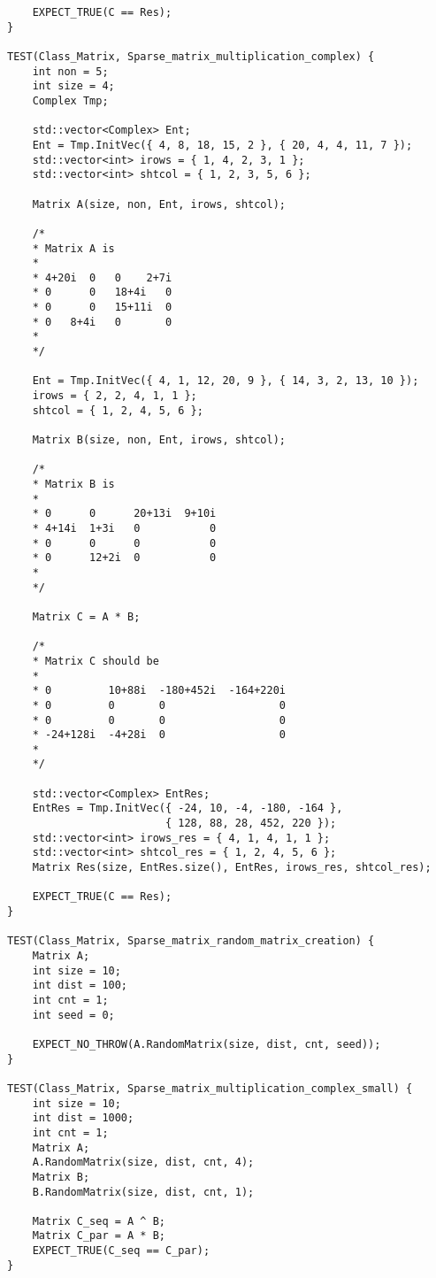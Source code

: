 \documentclass[12pt]{report}
\begin{document}
\begin{lstlisting}
    EXPECT_TRUE(C == Res);
}

TEST(Class_Matrix, Sparse_matrix_multiplication_complex) {
    int non = 5;
    int size = 4;
    Complex Tmp;

    std::vector<Complex> Ent;
    Ent = Tmp.InitVec({ 4, 8, 18, 15, 2 }, { 20, 4, 4, 11, 7 });
    std::vector<int> irows = { 1, 4, 2, 3, 1 };
    std::vector<int> shtcol = { 1, 2, 3, 5, 6 };

    Matrix A(size, non, Ent, irows, shtcol);

    /*
    * Matrix A is
    *
    * 4+20i  0   0    2+7i
    * 0      0   18+4i   0
    * 0      0   15+11i  0
    * 0   8+4i   0       0
    *
    */

    Ent = Tmp.InitVec({ 4, 1, 12, 20, 9 }, { 14, 3, 2, 13, 10 });
    irows = { 2, 2, 4, 1, 1 };
    shtcol = { 1, 2, 4, 5, 6 };

    Matrix B(size, non, Ent, irows, shtcol);

    /*
    * Matrix B is
    *
    * 0      0      20+13i  9+10i
    * 4+14i  1+3i   0           0
    * 0      0      0           0
    * 0      12+2i  0           0
    *
    */

    Matrix C = A * B;

    /*
    * Matrix C should be
    *
    * 0         10+88i  -180+452i  -164+220i
    * 0         0       0                  0
    * 0         0       0                  0
    * -24+128i  -4+28i  0                  0
    *
    */

    std::vector<Complex> EntRes;
    EntRes = Tmp.InitVec({ -24, 10, -4, -180, -164 },
                         { 128, 88, 28, 452, 220 });
    std::vector<int> irows_res = { 4, 1, 4, 1, 1 };
    std::vector<int> shtcol_res = { 1, 2, 4, 5, 6 };
    Matrix Res(size, EntRes.size(), EntRes, irows_res, shtcol_res);

    EXPECT_TRUE(C == Res);
}

TEST(Class_Matrix, Sparse_matrix_random_matrix_creation) {
    Matrix A;
    int size = 10;
    int dist = 100;
    int cnt = 1;
    int seed = 0;

    EXPECT_NO_THROW(A.RandomMatrix(size, dist, cnt, seed));
}

TEST(Class_Matrix, Sparse_matrix_multiplication_complex_small) {
    int size = 10;
    int dist = 1000;
    int cnt = 1;
    Matrix A;
    A.RandomMatrix(size, dist, cnt, 4);
    Matrix B;
    B.RandomMatrix(size, dist, cnt, 1);

    Matrix C_seq = A ^ B;
    Matrix C_par = A * B;
    EXPECT_TRUE(C_seq == C_par);
}


\end{lstlisting}
\end{document}

